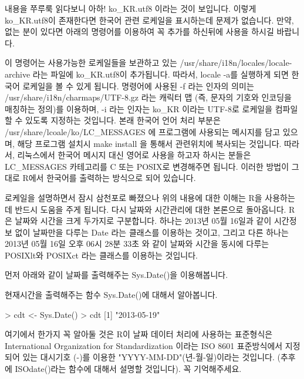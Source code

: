 내용을 쭈루룩 읽다보니 아하! ko\_KR.utf8 이라는 것이 보입니다. 
이렇게 ko\_KR.utf8이 존재한다면 한국어 관련 로케일을 표시하는데 문제가 없습니다. 
만약, 없는 분이 있다면 아래의 명령어를 이용하여 꼭 추가를 하신뒤에 사용을 하시길 바랍니다.

\begin{Schunk}
\end{Schunk}

이 명령어는 사용가능한 로케일들을 보관하고 있는 /usr/share/i18n/locales/locale-archive 라는 파일에 ko\_KR.utf8이 추가됩니다.
따라서, locale -a를 실행하게 되면 한국어 로케일을 볼 수 있게 됩니다. 
명령어에 사용된 -f 라는 인자의 의미는 /usr/share/i18n/charmaps/UTF-8.gz 라는 캐릭터 맵 (즉, 문자의 기호와 인코딩을 매칭하는 정의)를 이용하며, -i 라는 인자는 ko\_KR 이라는 UTF-8로 로케일을 컴파일 할 수 있도록 지정하는 것입니다. 
본래 한국어 언어 처리 부분은 /usr/share/lcoale/ko/LC\_MESSAGES 에 프로그램에 사용되는 메시지를 담고 있으며, 해당 프로그램 설치시 make install 을 통해서 관련위치에 복사되는 것입니다.
따라서, 리눅스에서 한국어 메시지 대신 영어로 사용을 하고자 하시는 분들은 LC\_MESSAGES 카테고리를 C 또는 POSIX로 변경해주면 됩니다. 
이러한 방법이 그대로 R에서 한국어를 출력하는 방식으로 되어 있습니다. 

로케일을 설명하면서 잠시 삼천포로 빠졌으나 위의 내용에 대한 이해는 R을 사용하는데 반드시 도움을 주게 됩니다. 
다시 날짜와 시간관리에 대한 본론으로 돌아옵니다.
R은 날짜와 시간을 크게 두가지로 구분합니다. 
하나는 2013년 05월 16일과 같이 시간정보 없이 날짜만을 다루는 Date 라는 클래스를 이용하는 것이고, 그리고 다른 하나는 2013년 05월 16일 오후 06시 28분 33초 와 같이 날짜와 시간을 동시에 다루는 POSIXlt와 POSIXct 라는 클래스를 이용하는 것입니다.

먼저 아래와 같이 날짜를 출력해주는 Sys.Date()을 이용해봅니다.

현재시간을 출력해주는 함수 Sys.Date()에 대해서 알아봅니다.
\begin{Schunk}
\begin{Soutput} 
> cdt <- Sys.Date()
> cdt
[1] "2013-05-19"
\end{Soutput}
\end{Schunk}

여기에서 한가지 꼭 알아둘 것은 R이 날짜 데이터 처리에 사용하는 표준형식은 International Organization for Standardization 이라는 ISO 8601 표준방식에서 지정되어 있는 대시기호 (-)를 이용한 "YYYY-MM-DD"(년-월-일)이라는 것입니다. 
(추후에 ISOdate()라는 함수에 대해서 설명할 것입니다).
꼭 기억해주세요.

